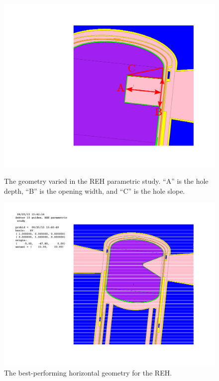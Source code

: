 \documentclass[a4paper]{jpconf}
\begin{document}
\begin{figure}[h]
\begin{minipage}{14pc}
\begin{center}
\includegraphics[scale=0.4,trim={13cm 6cm 4cm 5cm},clip]{graphics/para_geom.pdf}
\end{center}
\caption{\label{parametric_geom}The geometry varied in the REH parametric study. ``A'' is the hole depth, ``B'' is the opening width, and ``C'' is the hole slope.}
\end{minipage}\hspace{5pc}%
\begin{minipage}{11pc}
\begin{center}
\includegraphics[scale=0.4,trim={11.2cm 8cm 5cm 3cm},clip]{graphics/case077.pdf}
\end{center}
\caption{\label{case077}The best-performing horizontal geometry for the REH.}
\end{minipage} 
\end{figure}
\end{document}
